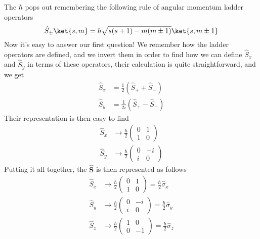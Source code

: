 \documentclass[a4paper, 11pt]{book}
\renewcommand{\vec}[1]{\mathbf{#1}}
\newcommand{\1}{\opr{\mathds{1}}}
\newcommand{\opr}[1]{\hat{#1}}
\newcommand{\ladopru}[1]{\opr{#1}_{+}}
\newcommand{\ladoprd}[1]{\opr{#1}_{-}}
\newcommand{\ladoprpm}[1]{\opr{#1}_{\pm}}
\newcommand{\vecopr}[1]{\opr{\vec{#1}}}
\theoremstyle{plain}
\begin{document}
	The $\hbar$ pops out remembering the following rule of angular momentum ladder operators
	\begin{equation}
		\ladoprpm{S}\ket{s,m}=\hbar\sqrt{s(s+1)-m(m\pm1)}\ket{s,m\pm1}
		\label{eq:spinladopr}
	\end{equation}
	Now it's easy to answer our first question! We remember how the ladder operators are defined, and we invert them in order to find how we can define $\opr{S}_x$ and $\opr{S}_y$ in terms of these operators, their calculation is quite straightforward, and we get
	\begin{equation}
		\begin{aligned}
			\opr{S}_x&=\frac{1}{2}\left( \ladopru{S}+\ladoprd{S} \right)\\
			\opr{S}_y&=\frac{1}{2i}\left( \ladopru{S}-\ladoprd{S} \right)
		\end{aligned}
		\label{eq:sxsyspsmrep}
	\end{equation}
	Their representation is then easy to find
	\begin{equation}
		\begin{aligned}
			\opr{S}_x&\to\frac{\hbar}{2}\begin{pmatrix}
				0&1\\
				1&0
			\end{pmatrix}\\
			\opr{S}_y&\to\frac{\hbar}{2}\begin{pmatrix}
				0&-i\\
				i&0
			\end{pmatrix}
		\end{aligned}
		\label{eq:sxsyrep}
	\end{equation}
	Putting it all together, the $\vecopr{S}$ is then represented as follows
	\begin{equation}
		\begin{aligned}
			\opr{S}_x&\to\frac{\hbar}{2}\begin{pmatrix}
				0&1\\
				1&0
			\end{pmatrix}=\frac{\hbar}{2}\opr{\sigma}_x\\
			\opr{S}_y&\to\frac{\hbar}{2}\begin{pmatrix}
				0&-i\\
				i&0
			\end{pmatrix}=\frac{\hbar}{2}\opr{\sigma}_y\\
			\opr{S}_z&\to\frac{\hbar}{2}\begin{pmatrix}
				1&0\\
				0&-1
			\end{pmatrix}=\frac{\hbar}{2}\opr{\sigma}_z
		\end{aligned}
		\label{eq:paulimatrices}
	\end{equation}
\end{document}
